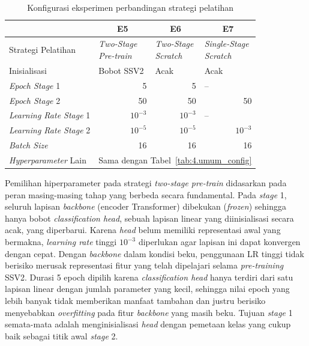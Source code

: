 \begin{table}[H]
\centering
\caption{Konfigurasi eksperimen perbandingan strategi pelatihan}
\label{tab:4.s2_config}
{\setlength{\tabcolsep}{3pt}
\footnotesize
\begin{tabular}{|l|l|l|l|}
\hline
\rowcolor{gray!15} \multicolumn{1}{|c|}{\textbf{Parameter}} & \multicolumn{1}{c|}{\textbf{E5}} & \multicolumn{1}{c|}{\textbf{E6}} & \multicolumn{1}{c|}{\textbf{E7}} \\
\hline
Strategi Pelatihan & \makecell[l]{\textit{Two-Stage}\\\textit{Pre-train}} & \makecell[l]{\textit{Two-Stage}\\\textit{Scratch}} & \makecell[l]{\textit{Single-Stage}\\\textit{Scratch}} \\
\hline
Inisialisasi & Bobot SSV2 & Acak & Acak \\
\hline
\textit{Epoch Stage} 1 & \multicolumn{1}{r|}{5} & \multicolumn{1}{r|}{5} & {--} \\
\hline
\textit{Epoch Stage} 2 & \multicolumn{1}{r|}{50} & \multicolumn{1}{r|}{50} & \multicolumn{1}{r|}{50} \\
\hline
\textit{Learning Rate Stage} 1 & \multicolumn{1}{r|}{$10^{-3}$} & \multicolumn{1}{r|}{$10^{-3}$} & {--} \\
\hline
\textit{Learning Rate Stage} 2 & \multicolumn{1}{r|}{$10^{-5}$} & \multicolumn{1}{r|}{$10^{-5}$} & \multicolumn{1}{r|}{$10^{-3}$} \\
\hline
\textit{Batch Size} & \multicolumn{1}{r|}{16} & \multicolumn{1}{r|}{16} & \multicolumn{1}{r|}{16} \\
\hline
\textit{Hyperparameter} Lain & \multicolumn{3}{l|}{Sama dengan Tabel~\ref{tab:4.umum_config}} \\
\hline
\end{tabular}
}
\end{table}

Pemilihan hiperparameter pada strategi \textit{two-stage pre-train} didasarkan pada peran masing-masing tahap yang berbeda secara fundamental. Pada \textit{stage} 1, seluruh lapisan \textit{backbone} (encoder Transformer) dibekukan (\textit{frozen}) sehingga hanya bobot \textit{classification head}, sebuah lapisan linear yang diinisialisasi secara acak, yang diperbarui. Karena \textit{head} belum memiliki representasi awal yang bermakna, \textit{learning rate} tinggi $10^{-3}$ diperlukan agar lapisan ini dapat konvergen dengan cepat. Dengan \textit{backbone} dalam kondisi beku, penggunaan LR tinggi tidak berisiko merusak representasi fitur yang telah dipelajari selama \textit{pre-training} SSV2. Durasi 5 epoch dipilih karena \textit{classification head} hanya terdiri dari satu lapisan linear dengan jumlah parameter yang kecil, sehingga nilai epoch yang lebih banyak tidak memberikan manfaat tambahan dan justru berisiko menyebabkan \textit{overfitting} pada fitur \textit{backbone} yang masih beku. Tujuan \textit{stage} 1 semata-mata adalah menginisialisasi \textit{head} dengan pemetaan kelas yang cukup baik sebagai titik awal \textit{stage} 2.

